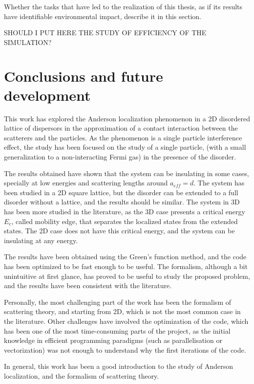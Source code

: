 \documentclass[a4paper,12pt]{article}
\begin{document}
{Whether the tasks that have led to the realization of this thesis, as if its results have identifiable environmental
impact, describe it in this section.}

SHOULD I PUT HERE THE STUDY OF EFFICIENCY OF THE SIMULATION?

\clearpage
\section{Conclusions and future development}

This work has explored the Anderson localization phenomenon in a 2D disordered lattice of dispersors in the approximation of a contact interaction between the scatterers and the particles. As the phenomenon is a single particle interference effect, the study has been focused on the study of a single particle, (with a small generalization to a non-interacting Fermi gas) in the presence of the disorder.

The results obtained have shown that the system can be insulating in some cases, specially at low energies and scattering lengths around $a_{eff}=d$. The system has been studied in a 2D square lattice, but the disorder can be extended to a full disorder without a lattice, and the results should be similar. The system in 3D has been more studied in the literature, as the 3D case presents a critical energy $E_c$, called mobility edge, that separates the localized states from the extended states. The 2D case does not have this critical energy, and the system can be insulating at any energy.

The results have been obtained using the Green's function method, and the code has been optimized to be fast enough to be useful. The formalism, although a bit unintuitive at first glance, has proved to be useful to study the proposed problem, and the results have been consistent with the literature. 

Personally, the most challenging part of the work has been the formalism of scattering theory, and starting from 2D, which is not the most common case in the literature. Other challenges have involved the optimization of the code, which has been one of the most time-consuming parts of the project, as the initial knowledge in efficient programming paradigms (such as parallelisation or vectorization) was not enough to understand why the first iterations of the code.

In general, this work has been a good introduction to the study of Anderson localization, and the formalism of scattering theory.
\end{document}

